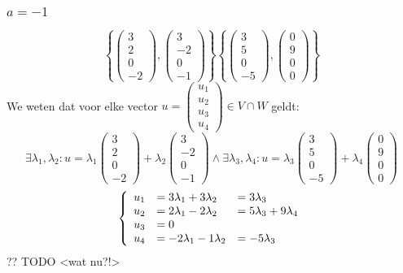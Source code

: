 \documentclass[lineaire_algebra_oplossingen.tex]{subfiles}
\begin{document}
\subsubsection*{$a=-1$}
\[
\left\lbrace
\begin{pmatrix}
3\\2\\0\\-2
\end{pmatrix}
,
\begin{pmatrix}
3\\-2\\0\\-1
\end{pmatrix}
\right\rbrace
\left\lbrace
\begin{pmatrix}
3\\5\\0\\-5
\end{pmatrix}
,
\begin{pmatrix}
0\\9\\0\\0
\end{pmatrix}
\right\rbrace
\]
We weten dat voor elke vector $u = \begin{pmatrix}
u_1\\u_2\\u_3\\u_4
\end{pmatrix} \in V\cap W$ geldt:
\[\exists \lambda_1,\lambda_2 :u = 
\lambda_1
\begin{pmatrix}
3\\2\\0\\-2
\end{pmatrix} + 
\lambda_2
\begin{pmatrix}
3\\-2\\0\\-1
\end{pmatrix}
\wedge
\exists \lambda_3,\lambda_4 :u = 
\lambda_3
\begin{pmatrix}
3\\5\\0\\-5
\end{pmatrix} + 
\lambda_4
\begin{pmatrix}
0\\9\\0\\0
\end{pmatrix}
\]
\[
\left\lbrace
\begin{array}{r l l}
u_1 &= 3\lambda_1+3\lambda_2 &= 3\lambda_3\\
u_2 &= 2\lambda_1-2\lambda_2 &= 5\lambda_3+9\lambda_4\\
u_3 &= 0\\
u_4 &= -2\lambda_1 -1\lambda_2 &= -5\lambda_3
\end{array}
\right.
\]
?? TODO <wat nu?!>
\end{document}

